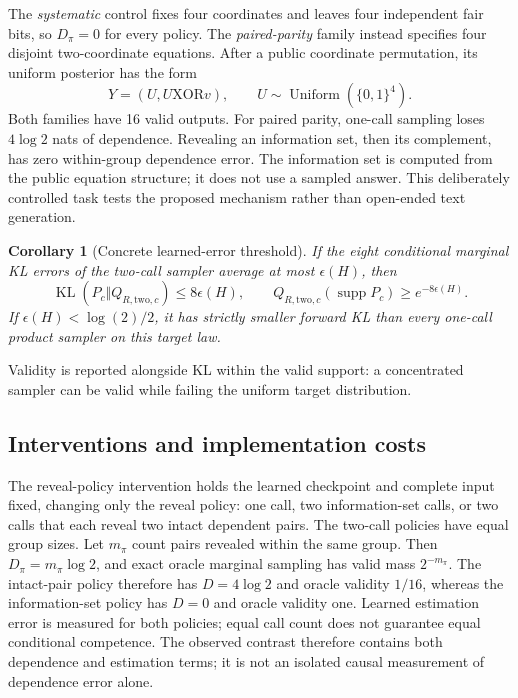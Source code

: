 \documentclass{article}
\newtheorem{corollary}{Corollary}
\newcommand{\KL}{\operatorname{KL}}
\begin{document}
The \emph{systematic} control fixes four coordinates and leaves four independent
fair bits, so $D_\pi=0$ for every policy. The \emph{paired-parity} family instead
specifies four disjoint two-coordinate equations. After a public coordinate
permutation, its uniform posterior has the form
\begin{equation}
 Y=(U,U\mathbin{\mathrm{XOR}}v),\qquad
 U\sim\operatorname{Uniform}(\{0,1\}^4).
\end{equation}
Both families have 16 valid outputs. For paired parity, one-call sampling
loses $4\log2$ nats of dependence. Revealing an information set, then its
complement, has zero within-group dependence error. The information set is
computed from the public equation structure; it does not use a sampled answer.
This deliberately controlled task tests the proposed mechanism rather than
open-ended text generation.

\begin{corollary}[Concrete learned-error threshold]
If the eight conditional marginal KL errors of the two-call sampler average
at most $\epsilon(H)$, then
\begin{equation}
 \KL(P_c\Vert Q_{R,\mathrm{two},c})\le8\epsilon(H),\qquad
 Q_{R,\mathrm{two},c}(\operatorname{supp}P_c)\ge e^{-8\epsilon(H)}.
\end{equation}
If $\epsilon(H)<\log(2)/2$, it has strictly smaller forward KL than every
one-call product sampler on this target law.
\end{corollary}
Validity is reported alongside KL within the valid support: a concentrated
sampler can be valid while failing the uniform target distribution.



\subsection{Interventions and implementation costs}
The reveal-policy intervention holds the learned checkpoint and complete input fixed,
changing only the reveal policy: one call, two information-set calls, or two
calls that each reveal two intact dependent pairs. The two-call policies have
equal group sizes. Let $m_\pi$ count pairs revealed within the same group.
Then $D_\pi=m_\pi\log2$, and exact oracle marginal sampling has valid mass
$2^{-m_\pi}$. The intact-pair policy therefore has $D=4\log2$ and oracle
validity $1/16$, whereas the information-set policy has $D=0$ and oracle
validity one. Learned estimation error is measured for both policies; equal
call count does not guarantee equal conditional competence. The observed
contrast therefore contains both dependence and estimation terms; it is not
an isolated causal measurement of dependence error alone.
\end{document}
